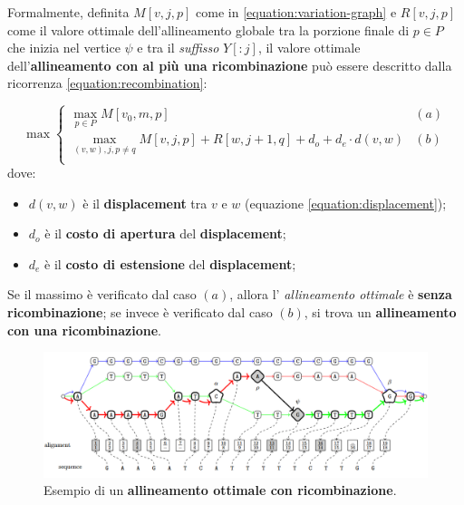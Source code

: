     Formalmente, definita $M[v, j, p]$ come in \ref{equation:variation-graph} e $R[v, j, p]$ come il valore ottimale dell'allineamento globale tra la porzione finale di $p \in P$ che inizia nel vertice $\psi$ e tra il \emph{suffisso} $Y[:j]$, il valore ottimale dell'\textbf{allineamento con al più una ricombinazione} può essere descritto dalla ricorrenza \ref{equation:recombination}:

    \begin{equation}
        \max {\begin{cases}
            \max_{p \in P}{M[v_0, m, p]} & (a) \\
            \max_{(v, w), j, p \neq q}{M[v, j, p] + R[w, j+1, q] + d_o + d_e \cdot d(v,w)} & (b) \\
        \end{cases}}
        \label{equation:recombination}
    \end{equation}
    dove:
    \begin{itemize}
        \item $d(v, w)$ è il \textbf{displacement} tra $v$ e $w$ (equazione \ref{equation:displacement});
        \item $d_o$ è il \textbf{costo di apertura} del \textbf{displacement};
        \item $d_e$ è il \textbf{costo di estensione} del \textbf{displacement};
    \end{itemize}

    Se il massimo è verificato dal caso $(a)$, allora l' \emph{allineamento ottimale} è \textbf{senza ricombinazione}; se invece è verificato dal caso $(b)$, si trova un \textbf{allineamento con una ricombinazione}.

    \vspace{20pt}
    \begin{figure}[H]
        \centering
        \includegraphics[width=1 \linewidth]{images/recombination_alignment.png}
        \caption{Esempio di un \textbf{allineamento ottimale con ricombinazione}. \cite{Recgraph}}
        \label{fig:recombination_alignment}
    \end{figure}
    

